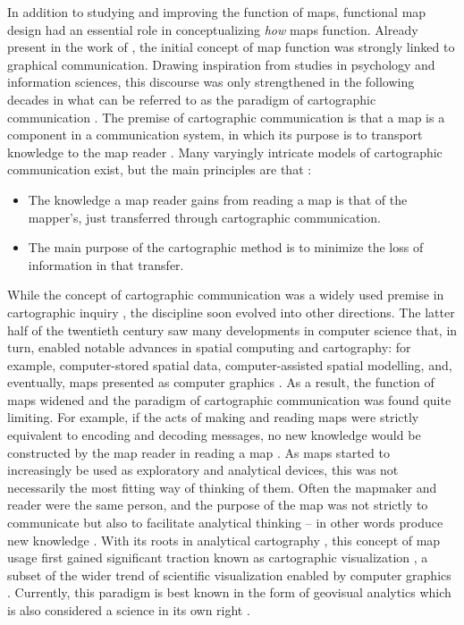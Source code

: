 In addition to studying and improving the function of maps,
functional map design had an essential role in conceptualizing \textit{how} maps function.
Already present in the work of \textcite{rob1952},
the initial concept of map function was strongly linked to graphical communication.
Drawing inspiration from studies in psychology and information sciences,
this discourse was only strengthened in the following decades
in what can be referred to as the paradigm of cartographic communication \parencite{fai2021}.
The premise of cartographic communication is
that a map is a component in a communication system,
in which its purpose is to transport knowledge to the map reader
\parencite{Boa2017}.
Many varyingly intricate models of cartographic communication exist,
but the main principles are that \parencite{ken2018}:
\begin{itemize}
	\item The knowledge a map reader gains from reading a map is that of the mapper's,
	just transferred through cartographic communication.
	\item The main purpose of the cartographic method is
	to minimize the loss of information in that transfer.
\end{itemize}

While the concept of cartographic communication was
a widely used premise in cartographic inquiry \parencite{ken2018},
the discipline soon evolved into other directions.
The latter half of the twentieth century saw many developments in computer science
that, in turn, enabled notable advances in spatial computing and cartography:
for example, computer-stored spatial data,
computer-assisted spatial modelling, and, eventually,
maps presented as computer graphics \parencite{kai2020}.
As a result, the function of maps widened
and the paradigm of cartographic communication was found quite limiting.
For example, if the acts of making and reading maps were strictly equivalent to
encoding and decoding messages,
no new knowledge would be constructed by the map reader in reading a map \parencite{mac2004}.
As maps started to increasingly be used
as exploratory and analytical devices,
this was not necessarily the most fitting way of thinking of them.
Often the mapmaker and reader were the same person,
and the purpose of the map was not strictly to communicate
but also to facilitate analytical thinking
-- in other words produce new knowledge \parencite{tob2000, ant1999, kry1995}.
With its roots in analytical cartography \parencite{tob1976},
this concept of map usage first gained significant traction known as
cartographic visualization \parencite{ant1999},
a subset of the wider trend of scientific visualization
enabled by computer graphics \parencite{nie1997}.
Currently, this paradigm is best known in the form of geovisual analytics
which is also considered a science in its own right \parencite{rob2017b}.

